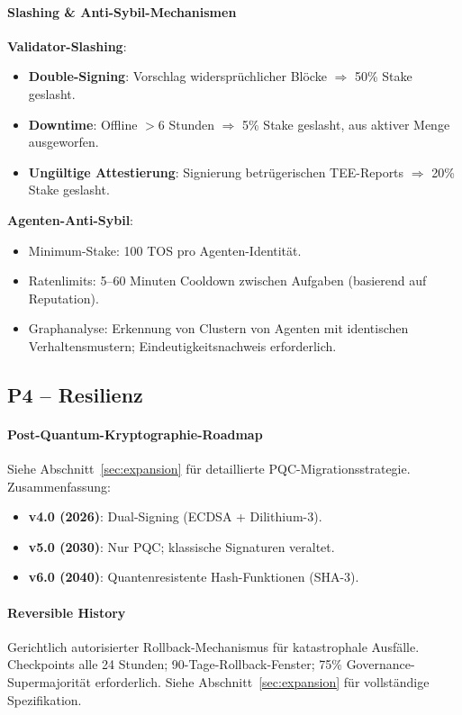 \documentclass[11pt]{article}
\begin{document}
\paragraph{Slashing \& Anti-Sybil-Mechanismen}
\textbf{Validator-Slashing}:
\begin{itemize}[noitemsep]
  \item \textbf{Double-Signing}: Vorschlag widersprüchlicher Blöcke $\Rightarrow$ 50\% Stake geslasht.
  \item \textbf{Downtime}: Offline $>$6 Stunden $\Rightarrow$ 5\% Stake geslasht, aus aktiver Menge ausgeworfen.
  \item \textbf{Ungültige Attestierung}: Signierung betrügerischen TEE-Reports $\Rightarrow$ 20\% Stake geslasht.
\end{itemize}

\textbf{Agenten-Anti-Sybil}:
\begin{itemize}[noitemsep]
  \item Minimum-Stake: 100 TOS pro Agenten-Identität.
  \item Ratenlimits: 5--60 Minuten Cooldown zwischen Aufgaben (basierend auf Reputation).
  \item Graphanalyse: Erkennung von Clustern von Agenten mit identischen Verhaltensmustern; Eindeutigkeitsnachweis erforderlich.
\end{itemize}

\subsection{P4 -- Resilienz}
\label{sec:pillar-resilience}

\paragraph{Post-Quantum-Kryptographie-Roadmap}
Siehe Abschnitt~\ref{sec:expansion} für detaillierte PQC-Migrationsstrategie. Zusammenfassung:
\begin{itemize}[noitemsep]
  \item \textbf{v4.0 (2026)}: Dual-Signing (ECDSA + Dilithium-3).
  \item \textbf{v5.0 (2030)}: Nur PQC; klassische Signaturen veraltet.
  \item \textbf{v6.0 (2040)}: Quantenresistente Hash-Funktionen (SHA-3).
\end{itemize}

\paragraph{Reversible History}
Gerichtlich autorisierter Rollback-Mechanismus für katastrophale Ausfälle. Checkpoints alle 24 Stunden; 90-Tage-Rollback-Fenster; 75\% Governance-Supermajorität erforderlich. Siehe Abschnitt~\ref{sec:expansion} für vollständige Spezifikation.
\end{document}
